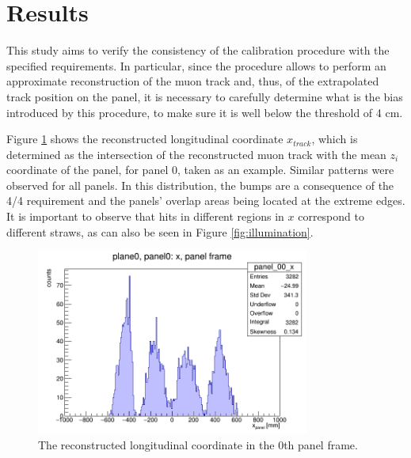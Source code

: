 \section{Results}

This study aims to verify the consistency of the 
calibration procedure with the specified requirements. In particular, since the 
procedure allows to perform an approximate reconstruction 
of the muon track and, thus, of the extrapolated track 
position on the panel, it is necessary to carefully determine 
what is the bias introduced by this procedure,  
to make sure it is well below the threshold of 4 cm.  

Figure \ref{fig:recx} shows the reconstructed 
longitudinal coordinate $x_{track}$, which is 
determined as the intersection of the reconstructed 
muon track with the mean $z_i$ coordinate of the panel, for panel 0, taken as an example.
Similar patterns were observed for all panels. In this distribution, the bumps 
are a consequence of the 4/4 requirement and the panels' overlap areas 
being located at the extreme edges. It is important to observe that 
hits in different regions in $x$ correspond to different 
straws, as can also be seen in Figure \ref{fig:illumination}. 

\begin{figure}[!h]
    \centering
    \includegraphics[width=0.8\textwidth]{figures/png/x_panel0.png}
    \caption[The reconstructed longitudinal coordinate in the 0th panel frame.]{The reconstructed longitudinal coordinate in the 0th panel frame.}
    \label{fig:recx}
\end{figure}

